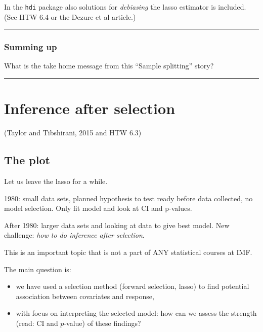 \documentclass[
  letterpaper,
  DIV=11,
  numbers=noendperiod]{scrartcl}
\providecommand{\tightlist}{%
  \setlength{\itemsep}{0pt}\setlength{\parskip}{0pt}}\usepackage{longtable,booktabs,array}
\begin{document}
In the \texttt{hdi} package also solutions for \emph{debiasing} the
lasso estimator is included. (See HTW 6.4 or the Dezure et al article.)

\begin{center}\rule{0.5\linewidth}{0.5pt}\end{center}

\hypertarget{summing-up}{%
\subsubsection{Summing up}\label{summing-up}}

What is the take home message from this ``Sample splitting'' story?

\begin{center}\rule{0.5\linewidth}{0.5pt}\end{center}

\hypertarget{inference-after-selection}{%
\section{Inference after selection}\label{inference-after-selection}}

(Taylor and Tibshirani, 2015 and HTW 6.3)

\hypertarget{the-plot}{%
\subsection{The plot}\label{the-plot}}

Let us leave the lasso for a while.

1980: small data sets, planned hypothesis to test ready before data
collected, no model selection. Only fit model and look at CI and
p-values.

After 1980: larger data sets and looking at data to give best model. New
challenge: \emph{how to do inference after selection}.

This is an important topic that is not a part of ANY statistical courses
at IMF.

The main question is:

\begin{itemize}
\tightlist
\item
  we have used a selection method (forward selection, lasso) to find
  potential association between covariates and response,
\item
  with focus on interpreting the selected model: how can we assess the
  strength (read: CI and \(p\)-value) of these findings?
\end{itemize}
\end{document}
